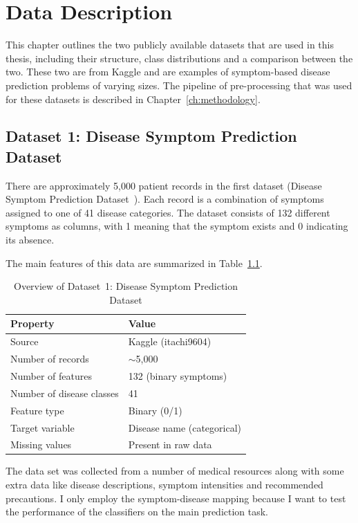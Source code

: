 \chapter{Data Description}
\label{ch:data_description}

This chapter outlines the two publicly available datasets that are used in this thesis, including their structure, class distributions and a comparison between the two. These two are from Kaggle and are examples of symptom-based disease prediction problems of varying sizes. The pipeline of pre-processing that was used for these datasets is described in Chapter~\ref{ch:methodology}.

\section{Dataset 1: Disease Symptom Prediction Dataset}
\label{sec:dataset1}

There are approximately 5,000 patient records in the first dataset (Disease Symptom Prediction Dataset~\citep{Kaggle_Disease2020}). Each record is a combination of symptoms assigned to one of 41 disease categories. The dataset consists of 132 different symptoms as columns, with 1 meaning that the symptom exists and 0 indicating its absence.

The main features of this data are summarized in Table~\ref{tab:dataset1_overview}.

\begin{table}[H]
\centering
\caption{Overview of Dataset~1: Disease Symptom Prediction Dataset}
\label{tab:dataset1_overview}
\begin{tabular}{@{}ll@{}}
\toprule
\textbf{Property}         & \textbf{Value} \\
\midrule
Source                     & Kaggle (itachi9604) \\
Number of records          & $\sim$5,000 \\
Number of features         & 132 (binary symptoms) \\
Number of disease classes  & 41 \\
Feature type               & Binary (0/1) \\
Target variable            & Disease name (categorical) \\
Missing values             & Present in raw data \\
\bottomrule
\end{tabular}
\end{table}

The data set was collected from a number of medical resources along with some extra data like disease descriptions, symptom intensities and recommended precautions. I only employ the symptom-disease mapping because I want to test the performance of the classifiers on the main prediction task.

